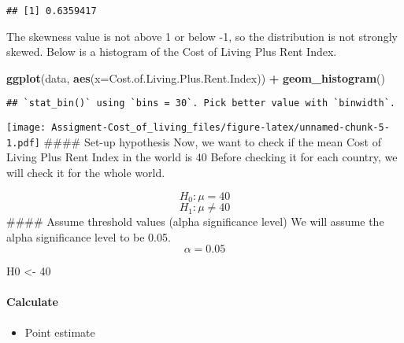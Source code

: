 \documentclass[
]{article}
\newenvironment{Shaded}{\begin{snugshade}}{\end{snugshade}}
\newcommand{\AttributeTok}[1]{\textcolor[rgb]{0.13,0.29,0.53}{#1}}
\newcommand{\DecValTok}[1]{\textcolor[rgb]{0.00,0.00,0.81}{#1}}
\newcommand{\FunctionTok}[1]{\textcolor[rgb]{0.13,0.29,0.53}{\textbf{#1}}}
\newcommand{\NormalTok}[1]{#1}
\newcommand{\OtherTok}[1]{\textcolor[rgb]{0.56,0.35,0.01}{#1}}
\newcommand{\SpecialCharTok}[1]{\textcolor[rgb]{0.81,0.36,0.00}{\textbf{#1}}}
\providecommand{\tightlist}{%
  \setlength{\itemsep}{0pt}\setlength{\parskip}{0pt}}
\begin{document}
\begin{Shaded}
\end{Shaded}

\begin{verbatim}
## [1] 0.6359417
\end{verbatim}

The skewness value is not above 1 or below -1, so the distribution is
not strongly skewed. Below is a histogram of the Cost of Living Plus
Rent Index.

\begin{Shaded}
\begin{Highlighting}[]
\FunctionTok{ggplot}\NormalTok{(data, }\FunctionTok{aes}\NormalTok{(}\AttributeTok{x=}\NormalTok{Cost.of.Living.Plus.Rent.Index)) }\SpecialCharTok{+}
  \FunctionTok{geom\_histogram}\NormalTok{()}
\end{Highlighting}
\end{Shaded}

\begin{verbatim}
## `stat_bin()` using `bins = 30`. Pick better value with `binwidth`.
\end{verbatim}

\texttt{[image: Assigment-Cost\_of\_living\_files/figure-latex/unnamed-chunk-5-1.pdf]}
\#\#\#\# Set-up hypothesis Now, we want to check if the mean Cost of
Living Plus Rent Index in the world is 40 Before checking it for each
country, we will check it for the whole world.

\[H_0: \mu = 40\] \[H_1: \mu \neq 40\] \#\#\#\# Assume threshold values
(alpha significance level) We will assume the alpha significance level
to be 0.05. \[\alpha = 0.05\]

\begin{Shaded}
\begin{Highlighting}[]
\NormalTok{H0 }\OtherTok{\textless{}{-}} \DecValTok{40}
\end{Highlighting}
\end{Shaded}

\paragraph{Calculate}\label{calculate}

\begin{itemize}
\tightlist
\item
  Point estimate
\end{itemize}
\end{document}
